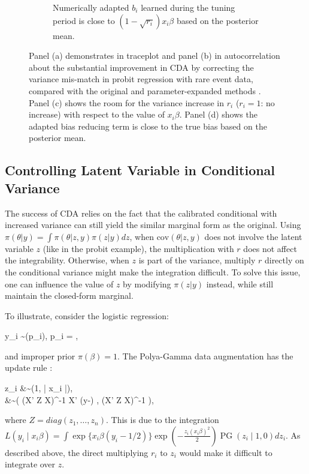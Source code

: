 \documentclass[10pt]{article}
\newcommand{\xbeta}{ x_i \beta}
\newcommand{\be}{\begin{equs}}
\newcommand{\ee}{\end{equs}}
\DeclareMathOperator{\No}{No}
\DeclareMathOperator{\PG}{PG}
\DeclareMathOperator{\Bern}{Bernoulli}
\begin{document}
\begin{figure}[H]
\begin{subfigure}[b]{0.49\textwidth}
  \caption{Numerically adapted $b_i$ learned during the tuning period is close to $(1-\sqrt{r_i} ) \xbeta$ based on the posterior mean.}
      \label{probit_reg_b}
\end{subfigure}
 \caption{Panel (a) demonstrates in traceplot and panel (b) in autocorrelation about the substantial improvement in CDA by correcting the variance mis-match in probit regression with rare event data, compared with the original \citep{albert1993bayesian} and parameter-expanded methods \citep{liu1999parameter}. Panel (c) shows the room for the variance increase in $r_i$ ($r_i=1$: no increase) with respect to the value of $\xbeta$. Panel (d) shows the adapted bias reducing term is close to the true bias based on the posterior mean.}
 \end{figure}

\subsection{Controlling Latent Variable in Conditional Variance}

The success of CDA relies on the fact that the calibrated conditional with increased variance can still yield the similar marginal form as the original. Using $\pi(\theta|y)=\int\pi(\theta|z,y)\pi(z|y) dz$, when $\mbox{cov}(\theta|z,y)$ does not involve the latent variable $z$ (like in the probit example), the multiplication with $r$ does not affect the integrability. Otherwise, when $z$ is part of the variance, multiply $r$ directly on the conditional variance might make the integration difficult. To solve this issue, one can influence the value of $z$ by modifying $\pi(z|y)$ instead, while still maintain the closed-form marginal.

To illustrate, consider the logistic regression:

\be
y_i \sim \Bern(p_i), \quad p_i = ,
\ee
and improper prior $\pi(\beta)=1$. The Polya-Gamma data augmentation has the update rule \citep{polson2013bayesian}:

\be
 z_i &\sim {\PG}(1, |\xbeta|),\\
\beta &\sim \No \left(  (X' Z X)^{-1}   X'  (y-)  ,  (X' Z X)^{-1}  \right),
\ee
where $Z= diag(z_1,\ldots,z_n)$. This is due to the integration $L(y_i \mid \xbeta)=  \int \exp\{ \xbeta (y_i-1/2)\} \exp(-\frac{z_i (\xbeta)^2}{2}) \PG(z_i \mid 1,0) dz_i$. As described above, the direct multiplying $r_i$ to $z_i$ would make it difficult to integrate over $z$.
\end{document}
